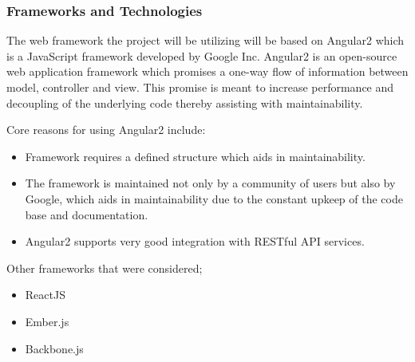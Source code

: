 \subsubsection{Frameworks and Technologies}
The web framework the project will be utilizing will be based on Angular2
which is a JavaScript framework developed by Google Inc. Angular2 is an 
open-source web application framework which promises a one-way flow of 
information between  model, controller and view. This promise is meant to 
increase performance and decoupling of the underlying code thereby assisting
with maintainability.

Core reasons for using Angular2 include:
\begin{itemize}
	\item Framework requires a defined structure which aids in maintainability.
	\item The framework is maintained not only by a community of users but also
	by Google, which aids in maintainability due to the 
	constant upkeep of the code base and documentation.
	\item Angular2 supports very good integration with RESTful API services.
\end{itemize}

Other frameworks that were considered;
\begin{itemize}
	\item ReactJS
	\item Ember.js 
	\item Backbone.js
\end{itemize}
